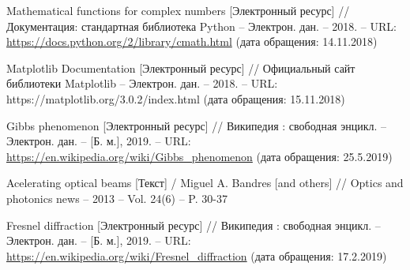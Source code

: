 \begin{thebibliography}{20\kern\bibindent}
Mathematical functions for complex numbers [Электронный
ресурс] // Документация: стандартная библиотека Python – Электрон. дан. – 2018. – URL: \url{https://docs.python.org/2/library/cmath.html} (дата обращения:
14.11.2018)

 Matplotlib Documentation [Электронный ресурс] // Официальный сайт
библиотеки Matplotlib – Электрон. дан. – 2018. -- URL:
https://matplotlib.org/3.0.2/index.html (дата обращения: 15.11.2018)



	Gibbs phenomenon [Электронный ресурс] // Википедия : свободная энцикл. –
Электрон. дан. – [Б. м.], 2019. – URL: \url{https://en.wikipedia.org/wiki/Gibbs_phenomenon} (дата обращения: 25.5.2019)

Acelerating optical beams [Текст] / Miguel A. Bandres [and others]  // Optics and photonics news – 2013 – Vol. 24(6) –
P. 30-37

	Fresnel diffraction [Электронный ресурс] // Википедия : свободная энцикл. –
Электрон. дан. – [Б. м.], 2019. – URL: \url{https://en.wikipedia.org/wiki/Fresnel_diffraction} (дата обращения:
17.2.2019)






\end{thebibliography}
	

\newpage

\titleformat{\subsection}[block]{\sloppy \bfseries \hspace{1.2cm} }{\thesubsection}{0.5em}{}
\setlength{\droptitle}{-1cm}
